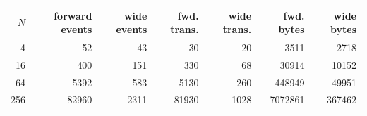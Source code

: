 \begin{center}
\small
\begin{tabular}{rrrrrrr}
\toprule
$N$ & forward events & wide events & fwd. trans. & wide trans. & fwd. bytes & wide bytes\\
\midrule
4 & 52 & 43 & 30 & 20 & 3511 & 2718\\
16 & 400 & 151 & 330 & 68 & 30914 & 10152\\
64 & 5392 & 583 & 5130 & 260 & 448949 & 49951\\
256 & 82960 & 2311 & 81930 & 1028 & 7072861 & 367462\\
\bottomrule
\end{tabular}
\end{center}
